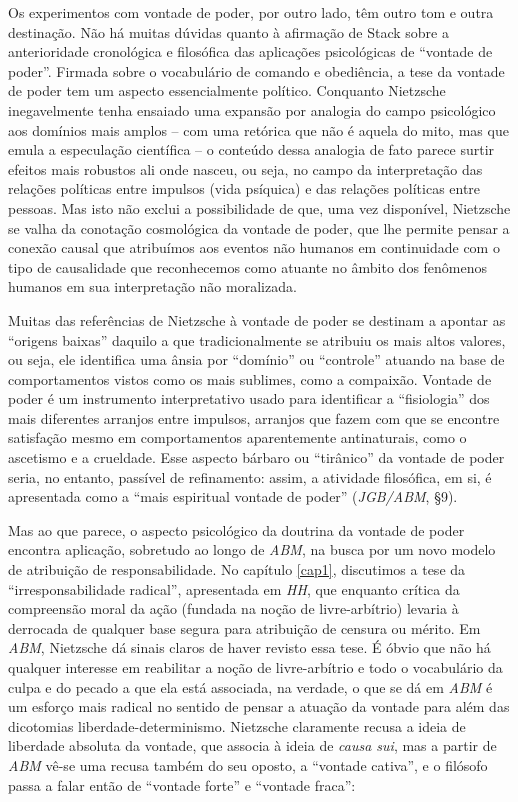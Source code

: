 \documentclass[
	12pt,				%
	openright,			%
	oneside,			%
	a4paper,			%
	english,			%
	french,				%
	spanish,			%
	brazil				%
	]{abntex2}
\begin{document}
Os experimentos com vontade de poder, por outro lado, têm outro tom e outra destinação. Não há muitas dúvidas quanto à afirmação de Stack sobre a anterioridade cronológica e filosófica das aplicações psicológicas de “vontade de poder”. Firmada sobre o vocabulário de comando e obediência, a tese da vontade de poder tem um aspecto essencialmente político. Conquanto Nietzsche inegavelmente tenha ensaiado uma expansão por analogia do campo psicológico aos domínios mais amplos – com uma retórica que não é aquela do mito, mas que emula a especulação científica – o conteúdo dessa analogia de fato parece surtir efeitos mais robustos ali onde nasceu, ou seja, no campo da interpretação das relações políticas entre impulsos (vida psíquica) e das relações políticas entre pessoas. Mas isto não exclui a possibilidade de que, uma vez disponível, Nietzsche se valha da conotação cosmológica da vontade de poder, que lhe permite pensar a conexão causal que atribuímos aos eventos não humanos em continuidade com o tipo de causalidade que reconhecemos como atuante no âmbito dos fenômenos humanos em sua interpretação não moralizada.

	Muitas das referências de Nietzsche à vontade de poder se destinam a apontar as “origens baixas” daquilo a que tradicionalmente se atribuiu os mais altos valores, ou seja, ele identifica uma ânsia por “domínio” ou “controle” atuando na base de comportamentos vistos como os mais sublimes, como a compaixão. Vontade de poder é um instrumento interpretativo usado para identificar a “fisiologia” dos mais diferentes arranjos entre impulsos, arranjos que fazem com que se encontre satisfação mesmo em comportamentos aparentemente antinaturais, como o ascetismo e a crueldade. Esse aspecto bárbaro ou “tirânico” da vontade de poder seria, no entanto, passível de refinamento: assim, a atividade filosófica, em si, é apresentada como a “mais espiritual vontade de poder” (\textit{JGB/ABM}, §9). 

Mas ao que parece, o aspecto psicológico da doutrina da vontade de poder encontra aplicação, sobretudo ao longo de \textit{ABM}, na busca por um novo modelo de atribuição de responsabilidade. No capítulo \ref{cap1}, discutimos a tese da “irresponsabilidade radical”, apresentada em \textit{HH}, que enquanto crítica da compreensão moral da ação (fundada na noção de livre-arbítrio) levaria à derrocada de qualquer base segura para atribuição de censura ou mérito. Em \textit{ABM}, Nietzsche dá sinais claros de haver revisto essa tese. É óbvio que não há qualquer interesse em reabilitar a noção de livre-arbítrio e todo o vocabulário da culpa e do pecado a que ela está associada, na verdade, o que se dá em \textit{ABM} é um esforço mais radical no sentido de pensar a atuação da vontade para além das dicotomias liberdade-determinismo. Nietzsche claramente recusa a ideia de liberdade absoluta da vontade, que associa à ideia de \textit{causa sui}, mas a partir de \textit{ABM} vê-se uma recusa também do seu oposto, a “vontade cativa”, e o filósofo passa a falar então de “vontade forte” e “vontade fraca”:
\end{document}
